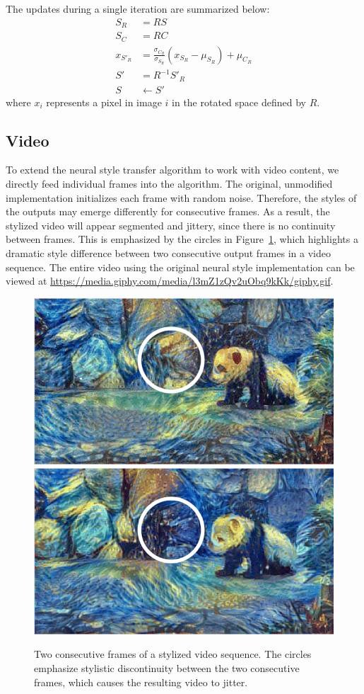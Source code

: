 \documentclass[10pt,twocolumn,letterpaper]{article}
\begin{document}
The updates during a single iteration are summarized below:
\begin{align}
  S_R &= R S \\
  S_C &= R C \\
  x_{S'_R} &= \frac{\sigma_{C_R}}{\sigma_{S_R}} (x_{S_R} - \mu_{S_R}) + \mu_{C_R} \\
  S' &= R^{-1} S'_R \\
  S &\leftarrow S'
\end{align}
where $x_i$ represents a pixel in image $i$ in the rotated space defined by $R$.

\subsection{Video}
To extend the neural style transfer algorithm to work with video content, we directly feed individual frames into the algorithm. The original, unmodified implementation initializes each frame with random noise. Therefore, the styles of the outputs may emerge differently for consecutive frames. As a result, the stylized video will appear segmented and jittery, since there is no continuity between frames. This is emphasized by the circles in Figure~\ref{fig:video-orig}, which highlights a dramatic style difference between two consecutive output frames in a video sequence. The entire video using the original neural style implementation can be viewed at \url{https://media.giphy.com/media/l3mZ1zQv2uObq9kKk/giphy.gif}.

\begin{figure}[ht]
\centering
\includegraphics[width=0.49\linewidth]{imgs/panda1.png}
\includegraphics[width=0.49\linewidth]{imgs/panda2.png}
\caption{Two consecutive frames of a stylized video sequence. The circles emphasize stylistic discontinuity between the two consecutive frames, which causes the resulting video to jitter.}
\label{fig:video-orig}
\end{figure}
\end{document}

